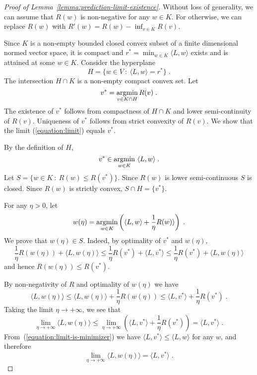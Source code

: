 \begin{proof}[Proof of Lemma~\ref{lemma:prediction-limit-existence}]
Without loss of generality, we can assume that $R(w)$ is non-negative for any
$w \in K$.  For otherwise, we can replace $R(w)$ with $R'(w) = R(w) - \inf_{v
\in K} R(v)$.

Since $K$ is a non-empty bounded closed convex subset of a finite dimensional
normed vector space, it is compact and $r^* = \min_{w \in K} \langle L, w
\rangle$ exists and is attained at some $w \in K$. Consider the hyperplane
$$
H = \{ w \in V ~:~ \langle L, w \rangle = r^* \} \; .
$$
The intersection $H \cap K$ is a non-empty compact convex set.
Let
$$
v^* = \operatorname*{argmin}_{v \in K \cap H} R(v) \; .
$$
The existence of $v^*$ follows from compactness of $H \cap K$ and lower
semi-continuity of $R(v)$.  Uniqueness of $v^*$ follows from strict convexity
of $R(v)$. We show that the limit (\ref{equation:limit}) equals $v^*$.

By the definition of $H$,
\begin{equation}
\label{equation:limit-is-minimizer}
v^* \in \operatorname*{argmin}_{w \in K} \ \langle L, w \rangle \; .
\end{equation}
Let $S = \{ w \in K ~:~ R(w) \le R(v^*) \}$. Since $R(w)$ is lower
semi-continuous $S$ is closed. Since $R(w)$ is strictly convex, $S \cap H =
\{v^*\}$.

For any $\eta > 0$, let
$$
w(\eta) = \operatorname*{argmin}_{w \in K} \left( \langle L, w \rangle + \frac{1}{\eta} R(w) \rangle \right) \; .
$$
We prove that $w(\eta) \in S$. Indeed, by optimality of $v^*$ and $w(\eta)$,
$$
\frac{1}{\eta} R(w(\eta))  + \langle L, w(\eta) \rangle
\le
\frac{1}{\eta} R(v^*)  + \langle L, v^* \rangle
\le
\frac{1}{\eta} R(v^*)  + \langle L, w(\eta) \rangle
$$
and hence $R(w(\eta)) \le R(v^*)$.

By non-negativity of $R$ and optimality of $w(\eta)$ we have
$$
\langle L, w(\eta) \rangle
\le \langle L, w(\eta) \rangle + \frac{1}{\eta} R(w(\eta))
\le \langle L, v^* \rangle + \frac{1}{\eta} R(v^*) \; .
$$
Taking the limit $\eta \to +\infty$, we see that
$$
\lim_{\eta \to +\infty} \langle L, w(\eta) \rangle
\le\lim_{\eta \to +\infty} \left( \langle L, v^* \rangle + \frac{1}{\eta} R(v^*) \right)
= \langle L, v^* \rangle \; .
$$
From~(\ref{equation:limit-is-minimizer}) we have
$\langle L, v^* \rangle \le \langle L, w \rangle$ for any $w$, and therefore
\begin{equation}
\label{equation:limit-equality}
\lim_{\eta \to +\infty} \langle L, w(\eta) \rangle = \langle L, v^* \rangle \; .
\end{equation}


\end{proof}
